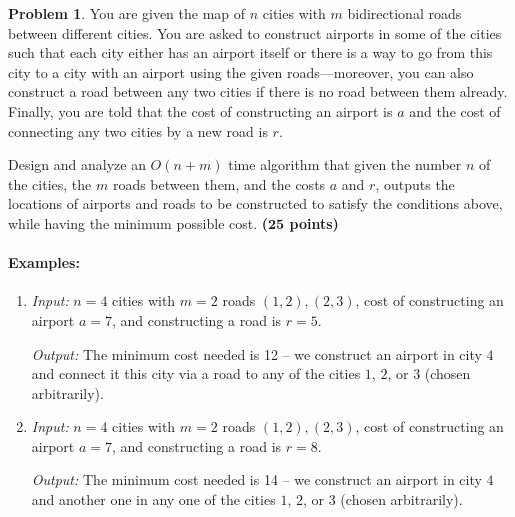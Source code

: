 \documentclass{article}
\theoremstyle{definition}
\newtheorem{problem}{Problem}
\newcommand{\grade}[1]{\hfill{\textbf{($\mathbf{#1}$ points)}}}
\begin{document}
\begin{problem}
You are given the map of $n$ cities with $m$ bidirectional roads between different cities. You are asked to construct airports in some of the cities such that each city either has an airport itself or there is a way to go from this city to a city with an airport 
using the given roads---moreover, you can also construct a road between any two cities if there is no road between them already. Finally, you are told that the cost of constructing an airport is $a$ and the cost of connecting any two cities 
by a new road is $r$. 

Design and analyze an $O(n+m)$ time algorithm that given the number $n$ of the cities, the $m$ roads between them, and the costs $a$ and $r$, outputs the locations of airports and roads to be constructed 
to satisfy the conditions above, while having the minimum possible cost. \grade{25}

\paragraph{Examples:}

\begin{enumerate}
    \item \emph{Input:} $n=4$ cities with $m=2$ roads $(1,2), (2,3)$, cost of constructing an airport $a = 7$, and constructing a road is $r=5$. 
    
   \emph{Output:} The minimum cost needed is 12 -- we construct an airport in city $4$ and connect it this city via a road to any of the cities $1$, $2$, or $3$ (chosen arbitrarily). 
 
    \item \emph{Input:} $n=4$ cities with $m=2$ roads $(1,2), (2,3)$, cost of constructing an airport $a = 7$, and constructing a road is $r=8$. 
    
   \emph{Output:} The minimum cost needed is 14 -- we construct an airport in city $4$ and another one in any one of the cities $1$, $2$, or $3$ (chosen arbitrarily). 

\end{enumerate}
\end{problem}
\end{document}

